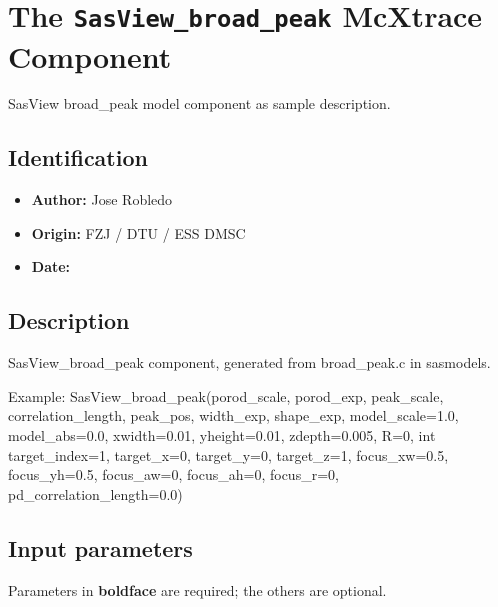 \section{The \texttt{SasView\_broad\_peak} McXtrace Component}
SasView broad\_peak model component as sample description.

\subsection*{Identification}
\begin{itemize}
  \item \textbf{Author:} Jose Robledo
  \item \textbf{Origin:} FZJ / DTU / ESS DMSC
  \item \textbf{Date:} 
\end{itemize}

\subsection*{Description}
SasView\_broad\_peak component, generated from broad\_peak.c in sasmodels.

Example: SasView\_broad\_peak(porod\_scale, porod\_exp, peak\_scale, correlation\_length, peak\_pos, width\_exp, shape\_exp, model\_scale=1.0, model\_abs=0.0, xwidth=0.01, yheight=0.01, zdepth=0.005, R=0, int target\_index=1, target\_x=0, target\_y=0, target\_z=1, focus\_xw=0.5, focus\_yh=0.5, focus\_aw=0, focus\_ah=0, focus\_r=0, pd\_correlation\_length=0.0)

\subsection*{Input parameters}
Parameters in \textbf{boldface} are required; the others are optional.

